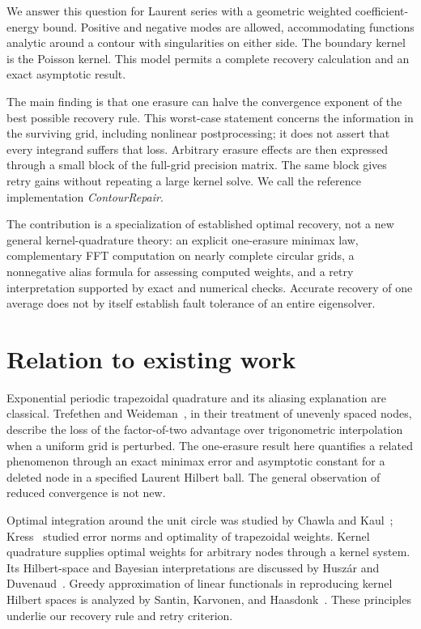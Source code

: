 \documentclass[11pt]{article}
\begin{document}
We answer this question for Laurent series with a geometric weighted coefficient-energy bound. Positive and negative modes are allowed, accommodating functions analytic around a contour with singularities on either side. The boundary kernel is the Poisson kernel. This model permits a complete recovery calculation and an exact asymptotic result.

The main finding is that one erasure can halve the convergence exponent of the best possible recovery rule. This worst-case statement concerns the information in the surviving grid, including nonlinear postprocessing; it does not assert that every integrand suffers that loss. Arbitrary erasure effects are then expressed through a small block of the full-grid precision matrix. The same block gives retry gains without repeating a large kernel solve. We call the reference implementation \emph{ContourRepair}.

The contribution is a specialization of established optimal recovery, not a new general kernel-quadrature theory: an explicit one-erasure minimax law, complementary FFT computation on nearly complete circular grids, a nonnegative alias formula for assessing computed weights, and a retry interpretation supported by exact and numerical checks. Accurate recovery of one average does not by itself establish fault tolerance of an entire eigensolver.

\section{Relation to existing work}
Exponential periodic trapezoidal quadrature and its aliasing explanation are classical. Trefethen and Weideman~\cite{TW14}, in their treatment of unevenly spaced nodes, describe the loss of the factor-of-two advantage over trigonometric interpolation when a uniform grid is perturbed. The one-erasure result here quantifies a related phenomenon through an exact minimax error and asymptotic constant for a deleted node in a specified Laurent Hilbert ball. The general observation of reduced convergence is not new.

Optimal integration around the unit circle was studied by Chawla and Kaul~\cite{CK73}; Kress~\cite{Kress78} studied error norms and optimality of trapezoidal weights. Kernel quadrature supplies optimal weights for arbitrary nodes through a kernel system. Its Hilbert-space and Bayesian interpretations are discussed by Husz\'ar and Duvenaud~\cite{HD12}. Greedy approximation of linear functionals in reproducing kernel Hilbert spaces is analyzed by Santin, Karvonen, and Haasdonk~\cite{SKH}. These principles underlie our recovery rule and retry criterion.
\end{document}
